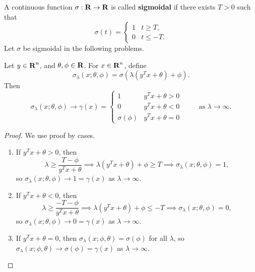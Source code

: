 \documentclass{homework}
\begin{document}
	\maketitle
	
	A continuous function $\sigma : \textbf{R} \to \textbf{R}$ is called \textbf{sigmoidal} if there exists $T > 0$ such that
	\begin{equation}
		\sigma(t) = \begin{cases}
			1 & t \ge T, \\
			0 & t \le -T.
		\end{cases}
	\end{equation}
	Let $\sigma$ be sigmoidal in the following problems.
	
	\question Let $y \in \textbf{R}^n$, and $\theta, \phi \in \textbf{R}$. For $x \in \textbf{R}^n$, define
	\begin{equation}
		\sigma_\lambda(x; \theta,\phi) = \sigma\left(\lambda\left(y^Tx + \theta\right) + \phi\right).
	\end{equation}
	Then
	\begin{equation}
		\sigma_\lambda(x;\theta,\phi) \to \gamma(x) = \begin{cases}
			1 & y^Tx + \theta > 0 \\
			0 & y^Tx + \theta < 0 \\
			\sigma(\phi) & y^Tx + \theta = 0
		\end{cases} \qquad \text{ as } \lambda \to\infty.
	\end{equation}
	\begin{proof}
		We use proof by cases.
		\begin{enumerate}
			\item If $y^Tx + \theta > 0$, then
			\begin{equation}
				\lambda \ge \frac{T - \phi}{y^Tx + \theta} \implies \lambda(y^Tx + \theta) + \phi \ge T \implies \sigma_\lambda(x;\theta,\phi) = 1,
			\end{equation}
			so $\sigma_\lambda(x;\theta, \phi) \to 1 = \gamma(x)$ as $\lambda \to\infty$.
			\item If $y^Tx + \theta < 0$, then
			\begin{equation}
				\lambda \ge \frac{-T - \phi}{y^T x + \theta}\implies \lambda(y^Tx +\theta) + \phi \le -T \implies \sigma_\lambda(x;\theta,\phi) = 0,
			\end{equation}
			so $\sigma_\lambda(x;\theta,\phi) \to 0 = \gamma(x)$ as $\lambda \to\infty$.
			\item If $y^Tx +\theta =0$, then $\sigma_\lambda(x;\phi,\theta) = \sigma(\phi)$ for all $\lambda$, so $\sigma_\lambda(x;\phi,\theta) \to \sigma(\phi) = \gamma(x)$ as $\lambda \to \infty$.
		\end{enumerate}
	\end{proof}
	
\end{document}

